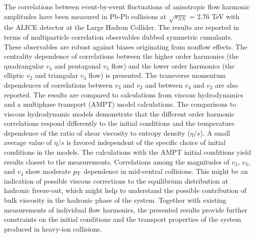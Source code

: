 The correlations between event-by-event fluctuations of anisotropic flow harmonic amplitudes
have been measured in Pb-Pb collisions at $\sqrt{s_{NN}}$ = 2.76 TeV with the ALICE detector at the Large Hadron Collider. 
The results are reported in terms of multiparticle correlation observables dubbed symmetric cumulants.
These observables are robust against biases originating from nonflow effects. 
The centrality dependence of correlations between the higher order harmonics (the quadrangular $v_4$ and pentagonal $v_5$ flow) and the lower order harmonics (the elliptic $v_2$ and triangular $v_3$ flow)
is presented. The transverse momentum dependences of correlations between $v_3$ and $v_2$ and between $v_4$ and $v_2$ are also reported. 
The results are compared to calculations from viscous hydrodynamics and  a multiphase transport ({AMPT}) model calculations.
The comparisons to viscous hydrodynamic models demonstrate that
the different order harmonic correlations respond differently to the initial conditions and the temperature dependence of the ratio of shear viscosity to entropy density ($\eta/s$). 
A small average value of $\eta/s$ is favored independent of the specific choice of initial conditions in the models. The calculations with the AMPT initial conditions yield results closest to the measurements. 
Correlations among the magnitudes of $v_2$, $v_3$, and $v_4$ show moderate $p_{\rm T}$ dependence in mid-central collisions. This might be an indication of possible viscous corrections to the equilibrium distribution at hadronic freeze-out, which might help to understand the possible contribution of bulk viscosity in the hadronic phase of the system.
Together with existing measurements of individual flow harmonics, the presented results provide further constraints 
on the initial conditions and the transport properties of the system produced in heavy-ion collisions.
